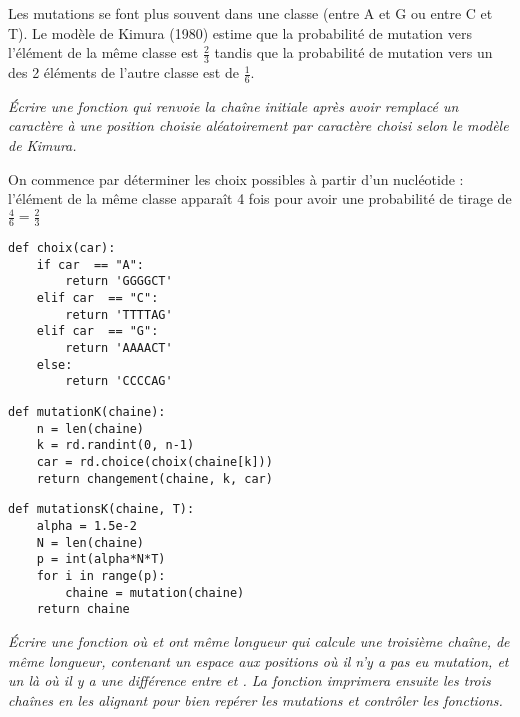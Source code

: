 Les mutations se font plus souvent dans une classe (entre A et G ou entre C et T). Le modèle de Kimura (1980) estime que la probabilité de mutation vers l'élément de la  même classe est $\frac 23$ tandis que la probabilité de mutation vers un des 2 éléments de l'autre classe est de $\frac 16$.
\begin{Exercise}[title = Question facultative]\it 
Écrire une fonction  qui renvoie la chaîne initiale après avoir remplacé un caractère à une position choisie aléatoirement par caractère choisi selon le modèle de Kimura.
\end{Exercise}
\begin{Answer}
On commence par déterminer les choix possibles à partir d'un nucléotide : l'élément de la même classe apparaît 4 fois pour avoir une probabilité de tirage de $\frac 46=\frac 23$
\begin{lstlisting}
def choix(car):
    if car  == "A":
        return 'GGGGCT'
    elif car  == "C":
        return 'TTTTAG'
    elif car  == "G":
        return 'AAAACT'
    else:
        return 'CCCCAG'
\end{lstlisting}

\begin{lstlisting}
def mutationK(chaine):
    n = len(chaine)
    k = rd.randint(0, n-1)
    car = rd.choice(choix(chaine[k]))
    return changement(chaine, k, car)
\end{lstlisting}

\begin{lstlisting}
def mutationsK(chaine, T):
    alpha = 1.5e-2
    N = len(chaine)
    p = int(alpha*N*T)
    for i in range(p):
        chaine = mutation(chaine)
    return chaine
\end{lstlisting}

\end{Answer}
\begin{Exercise}\it 
Écrire une fonction  où  et  ont même longueur qui calcule une troisième chaîne, de même longueur, contenant un espace aux positions où il n'y a pas eu mutation, et un  là où il y a une différence entre  et . La fonction imprimera ensuite les trois chaînes en les alignant pour bien repérer les mutations et contrôler les fonctions.
\end{Exercise}
